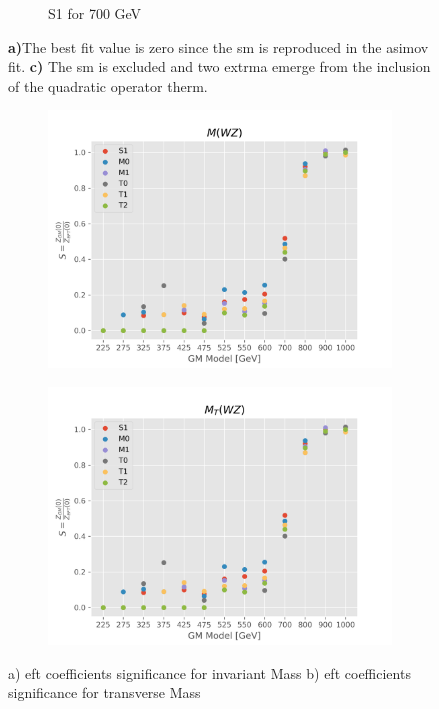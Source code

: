 \documentclass[../Bachelorarbeit.tex]{subfiles}
\begin{document}
\begin{figure}[h]
\begin{subfigure}{0.3\textwidth}
        \caption{S1 for 700 GeV}
    \end{subfigure}
    \caption{\textbf{a)}The best fit value is zero since the \acrshort{sm} is reproduced in the asimov fit.
        \textbf{c)} The \acrshort{sm} is excluded and two extrma emerge from the inclusion of the quadratic operator therm.}
    \label{fig:EFT_GM_Asimov_comparision}
\end{figure}

\begin{figure}[h]
    \centering
    \begin{subfigure}{0.45\textwidth}
        \includegraphics[width=\textwidth]{Plots/gm_relevanze/MWZ_all.png}
        \caption{}
    \end{subfigure}
    \begin{subfigure}{0.45\textwidth}
        \includegraphics[width=\textwidth]{Plots/gm_relevanze/MTWZ_all.png}
        \caption{}
    \end{subfigure}
    \caption{a) \acrshort{eft} coefficients significance for invariant Mass b) \acrshort{eft} coefficients significance for transverse Mass}
    \label{fig:significans_plots}
\end{figure}
\end{document}
